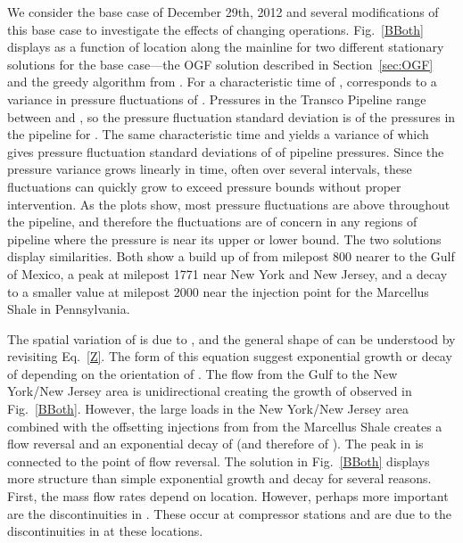 \documentclass[10pt, conference, compsocconf]{IEEEtran}
\begin{document}
We consider the base case of December 29th, 2012 and several modifications of this base case to investigate the effects of changing operations.   Fig.~\ref{BBoth} displays  as a function of location along the mainline for two different stationary solutions for the base case---the OGF solution described in Section~\ref{sec:OGF} and the greedy algorithm from \cite{13MFBBCP}. For a characteristic time of , \;  corresponds to a variance in pressure fluctuations of . Pressures in the Transco Pipeline range between  and , so the pressure fluctuation standard deviation is  of the pressures in the pipeline for . The same characteristic time and  yields a variance of  which gives pressure fluctuation standard deviations of  of pipeline pressures. Since the pressure variance grows linearly in time, often over several  intervals, these fluctuations can quickly grow to exceed pressure bounds without proper intervention. As the plots show, most pressure fluctuations are above  throughout the pipeline, and therefore the fluctuations are of concern in any regions of pipeline where the pressure is near its upper or lower bound. The two solutions display similarities. Both show a build up of  from milepost 800 nearer to the Gulf of Mexico, a peak at milepost 1771 near New York and New Jersey, and a decay to a smaller value at milepost 2000 near the injection point for the Marcellus Shale in Pennsylvania.

The spatial variation of  is due to , and the general shape of  can be understood by revisiting Eq.~\ref{Z}.  The form of this equation suggest exponential growth or decay of  depending on the orientation of . The flow from the Gulf to the New York/New Jersey area is unidirectional creating the growth of  observed in Fig.~\ref{BBoth}.  However, the large loads in the New York/New Jersey area combined with the offsetting injections from from the Marcellus Shale creates a flow reversal and an exponential decay of  (and therefore of ).  The peak in  is connected to the point of flow reversal.  The solution in Fig.~\ref{BBoth} displays more structure than simple exponential growth and decay for several reasons.  First, the mass flow rates  depend on location.  However, perhaps more important are the discontinuities in .  These occur at compressor stations and are due to the discontinuities in  at these locations.
\end{document}
